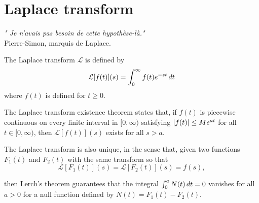 \section{Laplace transform}
\begin{flushright}
	\emph{" Je n'avais pas besoin de cette hypothèse-là."}\\ 
	
	Pierre-Simon, marquis de Laplace.
\end{flushright}
\label{sec:Laplace_transform}
The Laplace transform  $ \mathcal{L} $  is defined by
\[\mathcal{L}[f(t)](s)=\int_0^{\infty} f(t)e^{-st}\mathop{}\!d t\]
where $ f(t) $ is defined for $ t\geq0 $. 

The Laplace transform existence theorem states that, if $ f(t) $ is piecewise continuous on every finite interval in $ [0,\infty) $ satisfying $ \left\lvert f(t)\right\rvert\leq Me^{at}$	  
for all $ t\in [0,\infty) $, then $ \mathcal{L}[f(t)](s) $ exists for all $ s>a $. 

The Laplace transform is also unique, in the sense that, given two functions $ F_1(t) $ and $ F_2(t) $ with the same transform so that
\[\mathcal{L}[F_1(t)](s)=\mathcal{L}[F_2(t)](s)=f(s),\] 	

then Lerch's theorem guarantees that the integral
$ \int_0^a N(t)\mathop{}\!d t=0 $ 	
vanishes for all $ a>0 $ for a null function defined by
$ N(t)=F_1(t)-F_2(t) $. 

